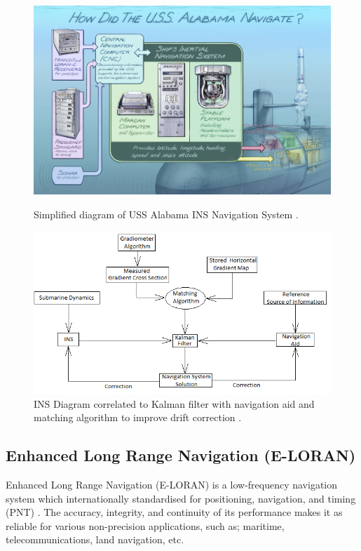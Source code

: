 \begin{figure}[!ht]
    \centering
    \includegraphics[scale=0.5]{Figures/USS_Alabama_INS.jpg}
    \caption{Simplified diagram of USS Alabama INS Navigation System \cite{HowNavigation}. }
    \label{fig:USS_INS}
    \vspace{2mm}
    \includegraphics[scale=0.7]{Figures/INS Scheme KALMAN filter.png}
    \caption{INS Diagram correlated to Kalman filter with navigation aid and matching algorithm to improve drift correction \cite{Rogobete2018UsingPositioning}. }
    \label{fig:INS_KALMAN}
\end{figure}

\subsection{Enhanced Long Range Navigation (E-LORAN)}

Enhanced Long Range Navigation (E-LORAN) is a low-frequency navigation system which internationally standardised for positioning, navigation, and timing (PNT) \cite{EnhancedApril}\cite{InternationalLORANAssociation2007EnhancedApril}. The accuracy, integrity, and continuity of its performance makes it as reliable for various non-precision applications, such as; maritime, telecommunications, land navigation, etc. \\

